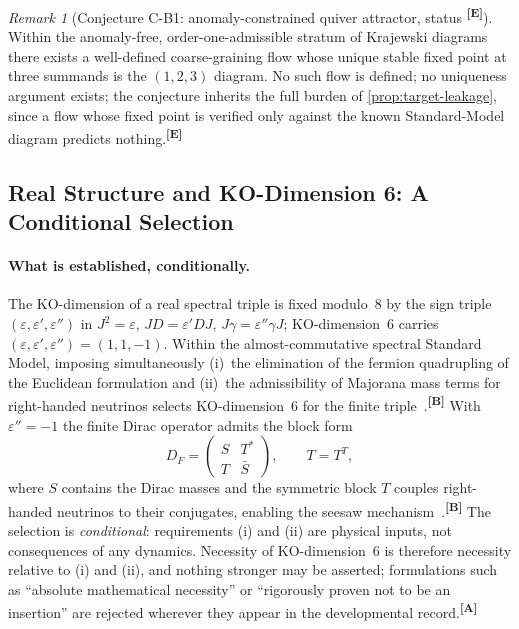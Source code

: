 \documentclass[12pt,a4paper,twoside]{article}
\theoremstyle{plain}
\theoremstyle{definition}
\theoremstyle{remark}
\newtheorem{remark}[theorem]{Remark}
\newcommand{\catmark}[1]{\textsuperscript{\textsf{\textbf{[#1]}}}}
\begin{document}
\begin{remark}[Conjecture C-B1: anomaly-constrained quiver attractor, status \catmark{E}]
\label{rem:quiver-conjecture}
Within the anomaly-free, order-one-admissible stratum of Krajewski
diagrams there exists a well-defined coarse-graining flow whose unique
stable fixed point at three summands is the $(1,2,3)$ diagram. No such
flow is defined; no uniqueness argument exists; the conjecture inherits
the full burden of \cref{prop:target-leakage}, since a flow whose fixed
point is verified only against the known Standard-Model diagram predicts
nothing.\catmark{E}
\end{remark}

\subsection{Real Structure and KO-Dimension 6: A Conditional Selection}
\label{app:b-ko6}

\paragraph{What is established, conditionally.}
The KO-dimension of a real spectral triple is fixed modulo~8 by the sign
triple $(\varepsilon,\varepsilon',\varepsilon'')$ in $J^2=\varepsilon$,
$JD=\varepsilon'DJ$, $J\gamma=\varepsilon''\gamma J$; KO-dimension~6
carries $(\varepsilon,\varepsilon',\varepsilon'')=(1,1,-1)$. Within the
almost-commutative spectral Standard Model, imposing simultaneously
(i)~the elimination of the fermion quadrupling of the Euclidean
formulation and (ii)~the admissibility of Majorana mass terms for
right-handed neutrinos selects KO-dimension~6 for the finite
triple~\cite{barrett2007,connes2006,ccm2007}.\catmark{B} With
$\varepsilon''=-1$ the finite Dirac operator admits the block form
\[
D_F=\begin{pmatrix} S & T^{*}\\[2pt] T & \bar S\end{pmatrix},
\qquad T=T^{T},
\]
where $S$ contains the Dirac masses and the symmetric block $T$ couples
right-handed neutrinos to their conjugates, enabling the seesaw
mechanism~\cite{connes2006,ccm2007}.\catmark{B} The selection is
\emph{conditional}: requirements (i) and (ii) are physical inputs, not
consequences of any dynamics. Necessity of KO-dimension~6 is therefore
necessity relative to (i) and (ii), and nothing stronger may be asserted;
formulations such as ``absolute mathematical necessity'' or ``rigorously
proven not to be an insertion'' are rejected wherever they appear in the
developmental record.\catmark{A}
\end{document}
